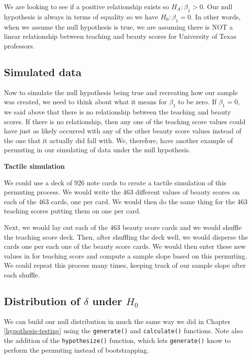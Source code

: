 \documentclass[12pt,]{krantz}
\begin{document}
We are looking to see if a positive relationship exists so
\(H_A: \beta_1 > 0\). Our null hypothesis is always in terms of equality
so we have \(H_0: \beta_1 = 0\). In other words, when we assume the null
hypothesis is true, we are assuming there is NOT a linear relationship
between teaching and beauty scores for University of Texas professors.

\subsection{Simulated data}\label{simulated-data-1}

Now to simulate the null hypothesis being true and recreating how our
sample was created, we need to think about what it means for \(\beta_1\)
to be zero. If \(\beta_1 = 0\), we said above that there is no
relationship between the teaching and beauty scores. If there is no
relationship, then any one of the teaching score values could have just
as likely occurred with any of the other beauty score values instead of
the one that it actually did fall with. We, therefore, have another
example of permuting in our simulating of data under the null
hypothesis.

\textbf{Tactile simulation}

We could use a deck of 926 note cards to create a tactile simulation of
this permuting process. We would write the 463 different values of
beauty scores on each of the 463 cards, one per card. We would then do
the same thing for the 463 teaching scores putting them on one per card.

Next, we would lay out each of the 463 beauty score cards and we would
shuffle the teaching score deck. Then, after shuffling the deck well, we
would disperse the cards one per each one of the beauty score cards. We
would then enter these new values in for teaching score and compute a
sample slope based on this permuting. We could repeat this process many
times, keeping track of our sample slope after each shuffle.

\subsection{\texorpdfstring{Distribution of \(\delta\) under
\(H_0\)}{Distribution of \textbackslash{}delta under H\_0}}\label{distribution-of-delta-under-h_0-1}

We can build our null distribution in much the same way we did in
Chapter \ref{hypothesis-testing} using the \texttt{generate()} and
\texttt{calculate()} functions. Note also the addition of the
\texttt{hypothesize()} function, which lets \texttt{generate()} know to
perform the permuting instead of bootstrapping.
\end{document}
